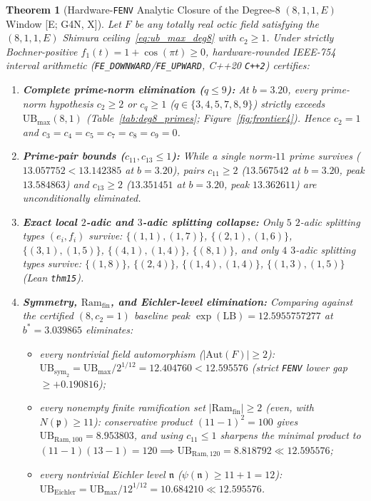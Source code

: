 \documentclass[11pt]{amsart}
\numberwithin{equation}{section}
\theoremstyle{plain}
\newtheorem{theorem}{Theorem}[section]
\theoremstyle{definition}\newtheorem{definition}[theorem]{Definition}
\theoremstyle{remark}\newtheorem{remark}[theorem]{Remark}
\newcommand{\frp}{\mathfrak{p}}
\newcommand{\Aut}{\mathrm{Aut}}
\newcommand{\Ram}{\mathrm{Ram}}
\newcommand{\ctag}[1]{\textup{\textsf{\scriptsize[#1]}}}
\begin{document}
\begin{theorem}[Hardware-\texttt{FENV} Analytic Closure of the Degree-$8$ $(8,1,1,E)$ Window \ctag{E; G4N, X}]\label{thm:deg8_closure}
Let $F$ be any totally real octic field satisfying the $(8,1,1,E)$ Shimura ceiling~\eqref{eq:ub_max_deg8} with $c_2 \ge 1$. Under strictly Bochner-positive $f_1(t) = 1+\cos(\pi t) \ge 0$, hardware-rounded IEEE-754 interval arithmetic \cite{moore1966} (\texttt{FE\_DOWNWARD}/\texttt{FE\_UPWARD}, C++20 \texttt{C++2}) certifies:
\begin{enumerate}[label=(\roman*),nosep]
\item \textbf{Complete prime-norm elimination ($q \le 9$):} At $b = 3.20$, every prime-norm hypothesis $c_2 \ge 2$ or $c_q \ge 1$ ($q\in\{3,4,5,7,8,9\}$) strictly exceeds $\mathrm{UB}_{\max}(8,1)$ (Table~\ref{tab:deg8_primes}; Figure~\ref{fig:frontier4}). Hence $c_2 = 1$ and $c_3 = c_4 = c_5 = c_7 = c_8 = c_9 = 0$.
\item \textbf{Prime-pair bounds ($c_{11}, c_{13} \le 1$):} While a single norm-$11$ prime survives ($13.057752 < 13.142385$ at $b=3.20$), pairs $c_{11} \ge 2$ ($13.567542$ at $b=3.20$, peak $13.584863$) and $c_{13} \ge 2$ ($13.351451$ at $b=3.20$, peak $13.362611$) are unconditionally eliminated.
\item \textbf{Exact local $2$-adic and $3$-adic splitting collapse:} Only $5$ $2$-adic splitting types $(e_i,f_i)$ survive: $\{(1,1),(1,7)\}$, $\{(2,1),(1,6)\}$, $\{(3,1),(1,5)\}$, $\{(4,1),(1,4)\}$, $\{(8,1)\}$, and only $4$ $3$-adic splitting types survive: $\{(1,8)\}$, $\{(2,4)\}$, $\{(1,4),(1,4)\}$, $\{(1,3),(1,5)\}$ (Lean \texttt{thm15}).
\item \textbf{Symmetry, $\Ram_{\mathrm{fin}}$, and Eichler-level elimination:} Comparing against the certified $(8, c_2=1)$ baseline peak $\exp(\mathrm{LB}) = 12.5955757277$ at $b^* = 3.039865$ eliminates:
\begin{itemize}[nosep]
\item every nontrivial field automorphism ($|\Aut(F)|\ge 2$): $\mathrm{UB}_{\mathrm{sym}_2} = \mathrm{UB}_{\max}/2^{1/12} = 12.404760 < 12.595576$ (strict \texttt{FENV} lower gap $\ge +0.190816$);
\item every nonempty finite ramification set $|\Ram_{\mathrm{fin}}| \ge 2$ (even, with $N(\frp)\ge 11$): conservative product $(11-1)^2=100$ gives $\mathrm{UB}_{\mathrm{Ram},100} = 8.953803$, and using $c_{11}\le 1$ sharpens the minimal product to $(11-1)(13-1)=120 \implies \mathrm{UB}_{\mathrm{Ram},120} = 8.818792 \ll 12.595576$;
\item every nontrivial Eichler level $\mathfrak{n}$ ($\psi(\mathfrak{n}) \ge 11+1 = 12$): $\mathrm{UB}_{\mathrm{Eichler}} = \mathrm{UB}_{\max}/12^{1/12} = 10.684210 \ll 12.595576$.

\end{itemize}
\end{enumerate}
\end{theorem}
\end{document}
